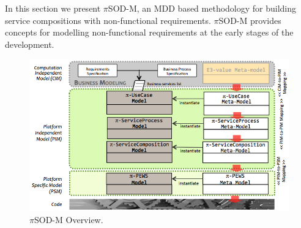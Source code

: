 
In this section we present $\pi$SOD-M, an MDD based methodology for building service compositions with non-functional requirements. $\pi$SOD-M provides concepts for  modelling  non-functional requirements at the early stages of the development.

\begin{figure}[h]
\centering
\includegraphics[width=1.0\textwidth]{figs/piSODM}
\caption{$\pi$SOD-M Overview.}
\label{fig:piSOD-M}
\end{figure}


